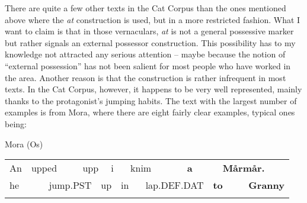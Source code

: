 \begin{styleBodytextC}
There are quite a few other texts in the Cat Corpus than the ones mentioned above where the \textit{at }construction is used, but in a more restricted fashion. What I want to claim is that in those vernaculars, \textit{at }is not a general possessive marker but rather signals an external possessor construction. This possibility has to my knowledge not attracted any serious attention – maybe because the notion of “external possession” has not been salient for most people who have worked in the area. Another reason is that the construction is rather infrequent in most texts. In the Cat Corpus, however, it happens to be very well represented, mainly thanks to the protagonist’s jumping habits. The text with the largest number of examples is from Mora, where there are eight fairly clear examples, typical ones being:

\end{styleBodytextC}


\begin{listWWNumileveli}
\item 

\begin{styleExample}
\label{bkm:Ref137369958}Mora (Os)

\end{styleExample}

\end{listWWNumileveli}

\begin{listWWNumlxxxvileveli}
\item 

\end{listWWNumlxxxvileveli}

\begin{tabular}{llllllllllllll}
\lsptoprule
An & \multicolumn{2}{l}{upped

} & \multicolumn{2}{l}{upp

} & \multicolumn{2}{l}{i

} & \multicolumn{2}{l}{knim

} & \multicolumn{2}{l}{{\bfseries a}

} & \multicolumn{2}{l}{{\bfseries Mårmår.}

} & \\
\multicolumn{2}{l}{he

} & \multicolumn{2}{l}{jump.PST

} & \multicolumn{2}{l}{up

} & \multicolumn{2}{l}{in

} & \multicolumn{2}{l}{lap.DEF.DAT

} & \multicolumn{2}{l}{{\bfseries to}

} & \multicolumn{2}{l}{{\bfseries Granny}

}\\
\lspbottomrule
\end{tabular}

